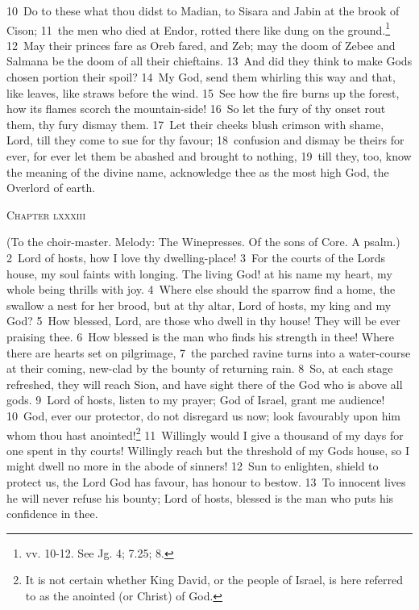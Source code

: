 \documentclass[10pt]{book} %
\begin{document}
\textcolor{benred8}{10}~Do to these what thou didst to Madian, to Sisara and Jabin at the brook of Cison; \textcolor{benred8}{11}~the men who died at Endor, rotted there like dung on the ground.\footnote[2]{vv. 10-12. See Jg. 4; 7.25; 8.} \textcolor{benred8}{12}~May their princes fare as Oreb fared, and Zeb; may the doom of Zebee and Salmana be the doom of all their chieftains. \textcolor{benred8}{13}~And did they think to make God\textquotesingle s chosen portion their spoil? \textcolor{benred8}{14}~My God, send them whirling this way and that, like leaves, like straws before the wind. \textcolor{benred8}{15}~See how the fire burns up the forest, how its flames scorch the mountain-side! \textcolor{benred8}{16}~So let the fury of thy onset rout them, thy fury dismay them. \textcolor{benred8}{17}~Let their cheeks blush crimson with shame, Lord, till they come to sue for thy favour; \textcolor{benred8}{18}~confusion and dismay be theirs for ever, for ever let them be abashed and brought to nothing, \textcolor{benred8}{19}~till they, too, know the meaning of the divine name, acknowledge thee as the most high God, the Overlord of earth.
\begin{large}\begin{center}\textsc{Chapter lxxxiii}\end{center}\end{large}
(To the choir-master. Melody: The Winepresses. Of the sons of Core. A psalm.)
\textcolor{benred8}{2}~Lord of hosts, how I love thy dwelling-place! \textcolor{benred8}{3}~For the courts of the Lord\textquotesingle s house, my soul faints with longing. The living God! at his name my heart, my whole being thrills with joy. \textcolor{benred8}{4}~Where else should the sparrow find a home, the swallow a nest for her brood, but at thy altar, Lord of hosts, my king and my God? \textcolor{benred8}{5}~How blessed, Lord, are those who dwell in thy house! They will be ever praising thee. \textcolor{benred8}{6}~How blessed is the man who finds his strength in thee! Where there are hearts set on pilgrimage, \textcolor{benred8}{7}~the parched ravine turns into a water-course at their coming, new-clad by the bounty of returning rain. \textcolor{benred8}{8}~So, at each stage refreshed, they will reach Sion, and have sight there of the God who is above all gods.
\textcolor{benred8}{9}~Lord of hosts, listen to my prayer; God of Israel, grant me audience! \textcolor{benred8}{10}~God, ever our protector, do not disregard us now; look favourably upon him whom thou hast anointed!\footnote[1]{It is not certain whether King David, or the people of Israel, is here referred to as the anointed (or Christ) of God.} \textcolor{benred8}{11}~Willingly would I give a thousand of my days for one spent in thy courts! Willingly reach but the threshold of my God\textquotesingle s house, so I might dwell no more in the abode of sinners! \textcolor{benred8}{12}~Sun to enlighten, shield to protect us, the Lord God has favour, has honour to bestow. \textcolor{benred8}{13}~To innocent lives he will never refuse his bounty; Lord of hosts, blessed is the man who puts his confidence in thee.
\end{document}
